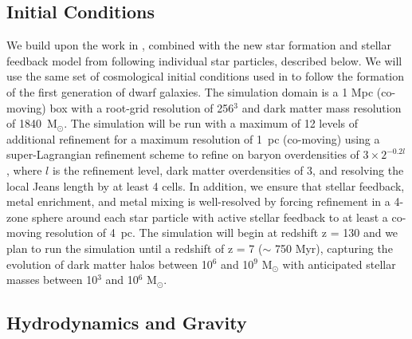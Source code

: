\documentclass[12pt]{article} %
\begin{document}
\subsection{Initial Conditions}

We build upon the work in \citep{Wise2012a,WiseAbel2012,Wise2014,Corlies2018}, combined with the new star formation and stellar feedback model from \citep{Emerick2019a} following individual star particles, described below. We will use the same set of cosmological initial conditions used in \citep{Wise2012a} to follow the formation of the first generation of dwarf galaxies. The simulation domain is a 1 Mpc (co-moving) box with a root-grid resolution of 256$^3$ and dark matter mass resolution of 1840~M$_{\odot}$. The simulation will be run with a maximum of 12 levels of additional refinement for a maximum resolution of 1~pc (co-moving) using a super-Lagrangian refinement scheme \citep{OsheaNorma2008} to refine on baryon overdensities of $3\times 2^{-0.2l}$, where $l$ is the refinement level, dark matter overdensities of 3, and resolving the local Jeans length by at least 4 cells. In addition, we ensure that stellar feedback, metal enrichment, and metal mixing is well-resolved by forcing refinement in a 4-zone sphere around each star particle with active stellar feedback to at least a co-moving resolution of 4~pc. The simulation will begin at redshift z = 130 and we plan to run the simulation until a redshift of z = 7 ($\sim$ 750 Myr), capturing the evolution of dark matter halos between 10$^6$ and 10$^9$ M$_{\odot}$ with anticipated stellar masses between 10$^3$ and 10$^6$ M$_{\odot}$.

\subsection{Hydrodynamics and Gravity}
\end{document}
